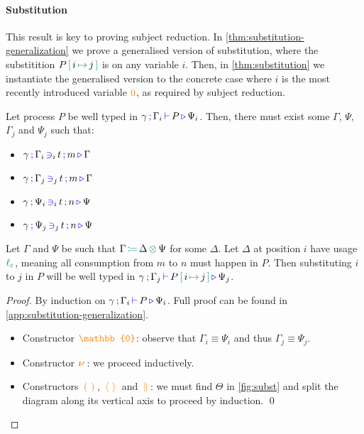 \documentclass[]{llncs}
\newcommand{\type}[1]{\textcolor{blue}{\operatorname{#1}}}
\newcommand{\constr}[1]{\textcolor{orange}{\operatorname{#1}}}
\newcommand{\func}[1]{\textcolor{teal}{\operatorname{#1}}}
\newcommand{\PO}{\constr{\mathbb{0}}}
\newcommand{\comp}[2]{#1 \, \constr{\parallel} \, #2}
\newcommand{\new}{\constr{\boldsymbol{\nu}} \,}
\newcommand{\send}[2]{#1 \, \constr{\langle} \, #2 \,\constr{\rangle} \,}
\newcommand{\recv}[2]{#1 \, \constr{\mathbb{(}} \, #2 \, \constr{\mathbb{)}} \,}
\newcommand{\subst}[3]{#1 \, \func{[} \, #3 \, \func{\mapsto} \,#2 \, \func{]}}
\newcommand{\opctx}[3]{#1 \, \func{\coloneqq} \, #2 \, \func{\otimes} \, #3}
\newcommand{\lz}{\func{\ell_{\varepsilon}}}
\newcommand{\types}[4]{#1 \, \type{;} \, #2 \, \type{\vdash} \, #3 \, \type{\triangleright} \, #4}
\newcommand{\contains}[6]{#1 \, \type{;} \, #2 \, \type{\ni}_{#3} \, #4 \, \type{;} \, #5 \, \type{\triangleright} \, #6}
\begin{document}
\paragraph*{Substitution}
This result is key to proving subject reduction.
In \autoref{thm:substitution-generalization} we prove a generalised version of substitution, where the substitition $\subst{P}{j}{i}$ is on any variable $i$.
Then, in \autoref{thm:substitution} we instantiate the generalised version to the concrete case where $i$ is the most recently introduced variable $\constr{0}$, as required by subject reduction.

\begin{nitheorem}
  \label{thm:substitution-generalization}
  Let process $P$ be well typed in $\types{\gamma}{\Gamma_i}{P}{\Psi_i}$.
  Then, there must exist some $\Gamma$, $\Psi$, $\Gamma_j$ and $\Psi_j$ such that:
  \begin{multicols}{2}
  \begin{itemize}
    \item $\contains{\gamma}{\Gamma_i}{i}{t}{m}{\Gamma}$
    \item $\contains{\gamma}{\Gamma_j}{j}{t}{m}{\Gamma}$
    \item $\contains{\gamma}{\Psi_i}{i}{t}{n}{\Psi}$
    \item $\contains{\gamma}{\Psi_j}{j}{t}{n}{\Psi}$
  \end{itemize}
  \end{multicols}
  Let $\Gamma$ and $\Psi$ be such that $\opctx{\Gamma}{\Delta}{\Psi}$ for some $\Delta$.
  Let $\Delta$ at position $i$ have usage $\lz$, meaning all consumption from $m$ to $n$ must happen in $P$.
  Then substituting $i$ to $j$ in $P$ will be well typed in $\types{\gamma}{\Gamma_j}{\subst{P}{j}{i}}{\Psi_j}$.
\end{nitheorem}

\begin{proof}[Proof]
  By induction on $\types{\gamma}{\Gamma_i}{P}{\Psi_i}$.
  Full proof can be found in \autoref{app:substitution-generalization}.
  \begin{itemize}
   \item
     Constructor $\PO$: observe that $\Gamma_i \equiv \Psi_i$ and thus $\Gamma_j \equiv \Psi_j$.
   \item
     Constructor $\new$: we proceed inductively.
   \item
     Constructors $\recv{}{}$, $\send{}{}$ and $\comp{}{}$: we must find $\Theta$ in \autoref{fig:subst} and split the diagram along its vertical axis to proceed by induction. \qed
 \end{itemize}
\end{proof}
\end{document}

